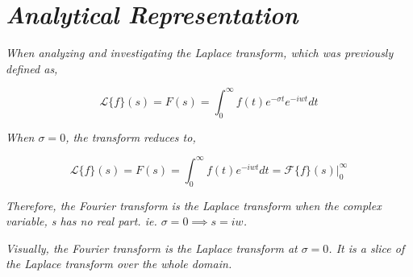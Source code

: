 

\section{\textit{Analytical Representation}}

	\textit{When analyzing and investigating the Laplace transform, which was previously defined as,}
	
		$$\mathcal{L}\{f\}(s) = F(s) = \int_0^{\infty}f(t)e^{-\sigma t}e^{-iwt} dt$$	
	
	\textit{When $\sigma = 0$, the transform reduces to,}	
	
		$$\mathcal{L}\{f\}(s) = F(s) = \int_0^{\infty}f(t)e^{-iwt} dt = \left.\mathcal{F}\{f\}(s)\right|_{0}^{\infty}$$

	\textit{Therefore, the Fourier transform is the Laplace transform when the complex variable, s has no real part. ie. $\sigma = 0 \implies s = iw$.}

	\textit{Visually, the Fourier transform is the Laplace transform at $\sigma = 0$. It is a slice of the Laplace transform over the whole domain.}



